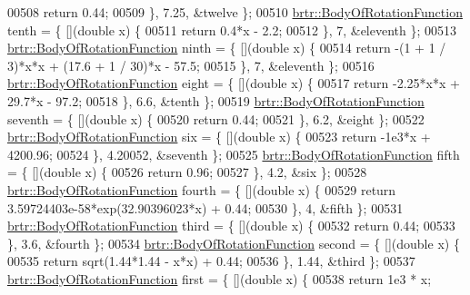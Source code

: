 \begin{DoxyCode}
00508             \textcolor{keywordflow}{return} 0.44;
00509         \}, 7.25, &twelve \};
00510         \hyperlink{structbrtr_1_1_body_of_rotation_function}{brtr::BodyOfRotationFunction} tenth = \{ [](\textcolor{keywordtype}{double} x) \{
00511             \textcolor{keywordflow}{return} 0.4*x - 2.2;
00512         \}, 7, &eleventh \};
00513         \hyperlink{structbrtr_1_1_body_of_rotation_function}{brtr::BodyOfRotationFunction} ninth = \{ [](\textcolor{keywordtype}{double} x) \{
00514             \textcolor{keywordflow}{return}  -(1 + 1 / 3)*x*x + (17.6 + 1 / 30)*x - 57.5;
00515         \}, 7, &eleventh \};
00516         \hyperlink{structbrtr_1_1_body_of_rotation_function}{brtr::BodyOfRotationFunction} eight = \{ [](\textcolor{keywordtype}{double} x) \{
00517             \textcolor{keywordflow}{return}   -2.25*x*x + 29.7*x - 97.2;
00518         \}, 6.6, &tenth \};
00519         \hyperlink{structbrtr_1_1_body_of_rotation_function}{brtr::BodyOfRotationFunction} seventh = \{ [](\textcolor{keywordtype}{double} x) \{
00520             \textcolor{keywordflow}{return} 0.44;
00521         \}, 6.2, &eight \};
00522         \hyperlink{structbrtr_1_1_body_of_rotation_function}{brtr::BodyOfRotationFunction} six = \{ [](\textcolor{keywordtype}{double} x) \{
00523             \textcolor{keywordflow}{return}  -1e3*x + 4200.96;
00524         \}, 4.20052, &seventh \};
00525         \hyperlink{structbrtr_1_1_body_of_rotation_function}{brtr::BodyOfRotationFunction} fifth = \{ [](\textcolor{keywordtype}{double} x) \{
00526             \textcolor{keywordflow}{return}  0.96;
00527         \}, 4.2, &six \};
00528         \hyperlink{structbrtr_1_1_body_of_rotation_function}{brtr::BodyOfRotationFunction} fourth = \{ [](\textcolor{keywordtype}{double} x) \{
00529             \textcolor{keywordflow}{return} 3.59724403e-58*exp(32.90396023*x) + 0.44;
00530         \}, 4, &fifth \};
00531         \hyperlink{structbrtr_1_1_body_of_rotation_function}{brtr::BodyOfRotationFunction} third = \{ [](\textcolor{keywordtype}{double} x) \{
00532             \textcolor{keywordflow}{return} 0.44;
00533         \}, 3.6, &fourth \};
00534         \hyperlink{structbrtr_1_1_body_of_rotation_function}{brtr::BodyOfRotationFunction} second = \{ [](\textcolor{keywordtype}{double} x) \{
00535             \textcolor{keywordflow}{return} sqrt(1.44*1.44 - x*x) + 0.44;
00536         \}, 1.44, &third \};
00537         \hyperlink{structbrtr_1_1_body_of_rotation_function}{brtr::BodyOfRotationFunction} first = \{ [](\textcolor{keywordtype}{double} x) \{
00538             \textcolor{keywordflow}{return} 1e3 * x;

\end{DoxyCode}
